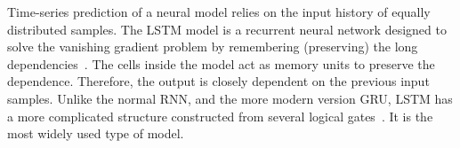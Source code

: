 Time-series prediction of a neural model relies on the input history of equally distributed samples.
{The LSTM model is a recurrent neural network designed to solve the vanishing gradient problem by remembering (preserving) the long dependencies~\cite{rasifaghihi_predictive_2020}.}
The cells inside the model act as memory units to preserve the dependence.
Therefore, the output is closely dependent on the previous input samples.
Unlike the normal RNN, and the more modern version GRU, LSTM has a more complicated structure constructed from several logical gates~\cite{LSTM_Hochreiter1997}.
It is the most widely used type of model.
